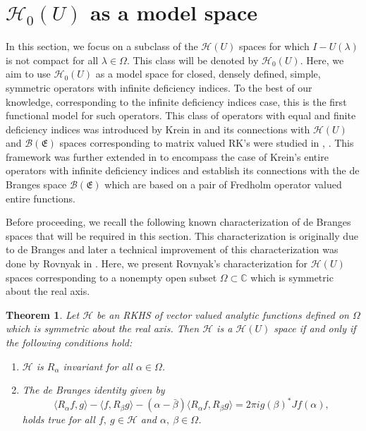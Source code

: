 \documentclass [12pt,reqno]{amsart}
\numberwithin{equation}{subsection}
\newtheorem{thm}{Theorem}[section]
\numberwithin{equation}{section}
\begin{document}
\section{$\mathcal{H}_0(U)$ as a model space}
\label{Section 3} 
In this section, we focus on a subclass of the \(\mathcal{H}(U)\) spaces for which $I-U(\lambda)$ is not compact for all $\lambda \in \Omega$. This class will be denoted by \(\mathcal{H}_0(U)\).
Here, we aim to use \(\mathcal{H}_0(U)\) as a model space for closed, densely defined, simple, symmetric operators with infinite deficiency indices. To the best of our knowledge, corresponding to the infinite deficiency indices case, this is the first functional model for such operators. This class of operators with equal and finite deficiency indices was introduced by Krein in \cite{fundamentalkrein} and its connections with $\mathcal{H}(U)$ and $\mathcal{B}(\mathfrak{E})$ spaces corresponding to matrix valued RK's were studied in \cite{alpay}, \cite{sarkar}. This framework was further extended in \cite{mahapatra} to encompass the case of Krein's entire operators with infinite deficiency indices and establish its connections with the de Branges space \(\mathcal{B}(\mathfrak{E})\) which are based on a pair of Fredholm operator valued entire functions.

Before proceeding, we recall the following known characterization of de Branges spaces that will be required in this section. This characterization is originally due to de Branges \cite{Branges 1} and later a technical improvement of this characterization was done by Rovnyak in \cite{Rovnyak}. Here, we present Rovnyak's characterization for $\mathcal{H}(U)$ spaces corresponding to a nonempty open subset $\Omega \subset \mathbb{C}$ which is symmetric about the real axis.

\begin{thm}\label{Theorem 3.1}
Let $\mathcal{H}$ be an RKHS of vector valued analytic functions defined on $\Omega$ which is symmetric about the real axis. Then $\mathcal{H}$ is a $\mathcal{H}(U)$ space if and only if the following conditions hold:
\begin{enumerate}
\item $\mathcal{H}$ is $R_{\alpha}$ invariant for all $\alpha \in \Omega$.
\item The de Branges identity given by  \begin{equation}
\langle R_{\alpha}f,g \rangle -\langle f,R_{\beta}g \rangle -(\alpha-\bar{\beta})\langle R_{\alpha}f, R_{\beta}g \rangle= 2\pi i g(\beta)^* Jf(\alpha),
\end{equation}
holds true for all $f,~g \in \mathcal{H}$ and $\alpha,~\beta \in \Omega$.
\end{enumerate}  
\end{thm}
\end{document}
